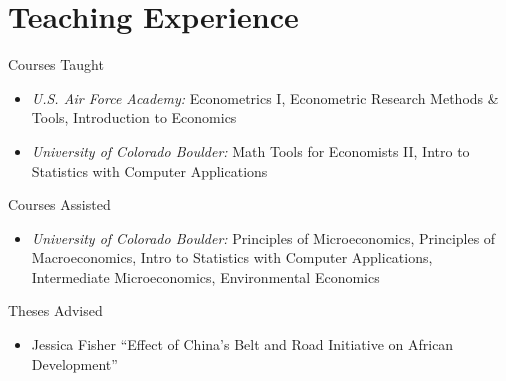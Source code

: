 \documentclass[letterpaper]{article}
\begin{document}
\section*{Teaching Experience}
  Courses Taught 
  \begin{itemize}[topsep=2pt,itemsep=-1pt,leftmargin=1em]
    \item[] \textit{U.S. Air Force Academy:} Econometrics I, Econometric Research Methods \& Tools, Introduction to Economics
    \item[] \textit{University of Colorado Boulder:} Math Tools for Economists II, Intro to Statistics with Computer Applications
  \end{itemize}
  \vspace*{.5em}
	Courses Assisted
	\begin{itemize}[topsep=2pt,itemsep=-1pt,leftmargin=1em]
    \item[] \textit{University of Colorado Boulder:} Principles of Microeconomics, Principles of Macroeconomics, Intro to Statistics with Computer Applications, Intermediate Microeconomics, Environmental Economics
  \end{itemize}
  \vspace*{.5em}
  Theses Advised
  \begin{itemize}[topsep=2pt,itemsep=-1pt,leftmargin=1em]
    \item[] Jessica Fisher ``Effect of China's Belt and Road Initiative on African Development'' 
  \end{itemize}
\end{document}
